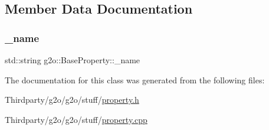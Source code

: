 \subsection{Member Data Documentation}
\mbox{\label{classg2o_1_1_base_property_a74e4bbf35ddf26022cb39be2ea7abd2b}} 
\subsubsection{\texorpdfstring{\+\_\+name}{\_name}}
{\footnotesize\ttfamily std\+::string g2o\+::\+Base\+Property\+::\+\_\+name\hspace{0.3cm}{\ttfamily [protected]}}



The documentation for this class was generated from the following files\+:\begin{DoxyCompactItemize}
\item 
Thirdparty/g2o/g2o/stuff/\mbox{\hyperlink{property_8h}{property.\+h}}\item 
Thirdparty/g2o/g2o/stuff/\mbox{\hyperlink{property_8cpp}{property.\+cpp}}\end{DoxyCompactItemize}

